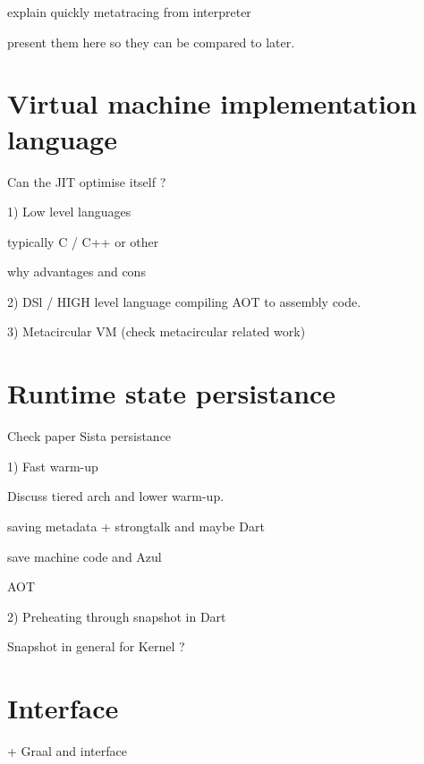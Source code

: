 \documentclass[a4paper,12pt,twoside]{../includes/ThesisStyle}
\begin{document}
explain quickly metatracing from interpreter

present them here so they can be compared to later.


\section{Virtual machine implementation language}


Can the JIT optimise itself ?

1) Low level languages

typically C / C++ or other

why advantages and cons

2) DSl / HIGH level language compiling AOT to assembly code.


3) Metacircular VM (check metacircular related work)


\section{Runtime state persistance}

Check paper Sista persistance

1) Fast warm-up

Discuss tiered arch and lower warm-up.

saving metadata + strongtalk and maybe Dart

save machine code and Azul

AOT

2) Preheating through snapshot in Dart

Snapshot in general for Kernel ?


\section{Interface}

+ Graal and interface
\end{document}
